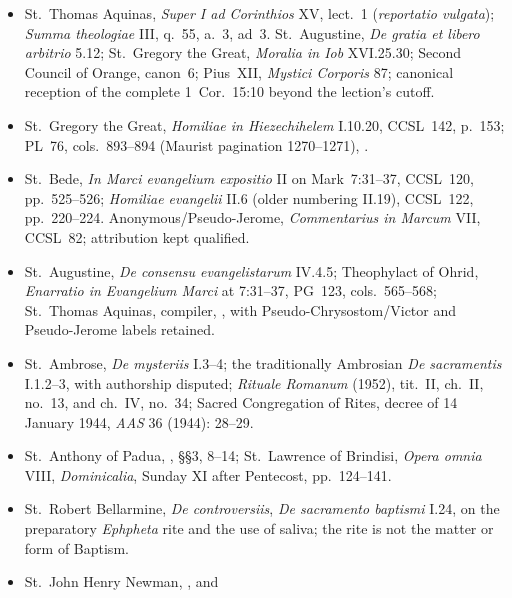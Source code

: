 {\begin{itemize}[itemsep=0em,topsep=0.15em,parsep=0pt]
{S. Pauli}, at 1~Cor.~15, PG~82, cols.~347--352.
\item St.~Thomas Aquinas, \emph{Super I ad Corinthios} XV, lect.~1
(\emph{reportatio vulgata}); \emph{Summa theologiae} III, q.~55, a.~3,
ad~3. St.~Augustine, \emph{De gratia et libero
arbitrio} 5.12; St.~Gregory the Great, \emph{Moralia in Iob} XVI.25.30;
Second Council of Orange, canon~6; Pius~XII, \emph{Mystici Corporis} 87;
canonical reception of the complete 1~Cor.~15:10 beyond the lection's cutoff.
\item St.~Gregory the Great, \emph{Homiliae in Hiezechihelem} I.10.20,
CCSL~142, p.~153; PL~76, cols.~893--894 (Maurist pagination 1270--1271),
.
\item St.~Bede, \emph{In Marci evangelium expositio} II on Mark~7:31--37,
CCSL~120, pp.~525--526; \emph{Homiliae evangelii} II.6 (older numbering
II.19), CCSL~122, pp.~220--224. Anonymous/Pseudo-Jerome,
\emph{Commentarius in Marcum} VII, CCSL~82; attribution kept qualified.
\item St.~Augustine, \emph{De consensu evangelistarum} IV.4.5;
Theophylact of Ohrid, \emph{Enarratio in Evangelium Marci} at 7:31--37,
PG~123, cols.~565--568; St.~Thomas Aquinas, compiler,
, with Pseudo-Chrysostom/Victor and Pseudo-Jerome labels retained.
\item St.~Ambrose, \emph{De mysteriis} I.3--4; the traditionally Ambrosian
\emph{De sacramentis} I.1.2--3, with authorship disputed; \emph{Rituale
Romanum} (1952), tit.~II, ch.~II, no.~13, and
ch.~IV, no.~34; Sacred Congregation of Rites, decree of 14 January 1944,
\emph{AAS} 36 (1944): 28--29.
\item St.~Anthony of Padua, , §§3, 8--14;
St.~Lawrence of Brindisi, \emph{Opera omnia} VIII, \emph{Dominicalia},
Sunday XI after Pentecost, pp.~124--141.
\item St.~Robert Bellarmine, \emph{De controversiis}, \emph{De sacramento
baptismi} I.24, on the preparatory \emph{Ephpheta} rite and the use of saliva;
the rite is not the matter or form of Baptism.
\item St.~John Henry Newman, , and

\end{itemize}}

